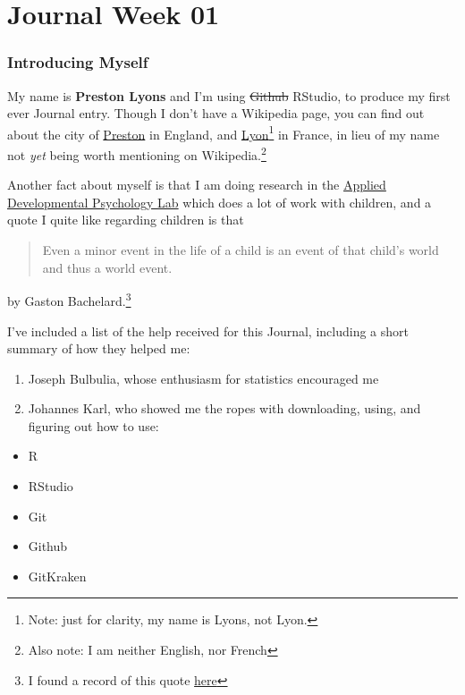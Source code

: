 \documentclass[
]{article}
\author{}
\date{\vspace{-2.5em}}
\providecommand{\tightlist}{%
  \setlength{\itemsep}{0pt}\setlength{\parskip}{0pt}}
\begin{document}
\hypertarget{journal-week-01}{%
\section{Journal Week 01}\label{journal-week-01}}

\hypertarget{introducing-myself}{%
\subsubsection{Introducing Myself}\label{introducing-myself}}

My name is \textbf{Preston Lyons} and I'm using \sout{Github} RStudio,
to produce my first ever Journal entry. Though I don't have a Wikipedia
page, you can find out about the city of
\href{https://en.wikipedia.org/wiki/Preston,_Lancashire}{Preston} in
England, and \href{https://en.wikipedia.org/wiki/Lyon}{Lyon}\footnote{Note:
  just for clarity, my name is Lyons, not Lyon.} in France, in lieu of
my name not \emph{yet} being worth mentioning on Wikipedia.\footnote{Also
  note: I am neither English, nor French}

Another fact about myself is that I am doing research in the
\href{https://applieddevelopmentallab.com/}{Applied Developmental
Psychology Lab} which does a lot of work with children, and a quote I
quite like regarding children is that

\begin{quote}
Even a minor event in the life of a child is an event of that child's
world and thus a world event.
\end{quote}

by Gaston Bachelard.\footnote{I found a record of this quote
  \href{https://www.goodreads.com/quotes/471937-even-a-minor-event-in-the-life-of-a-child}{here}}

I've included a list of the help received for this Journal, including a
short summary of how they helped me:

\begin{enumerate}
\def\labelenumi{\arabic{enumi}.}
\tightlist
\item
  Joseph Bulbulia, whose enthusiasm for statistics encouraged me
\item
  Johannes Karl, who showed me the ropes with downloading, using, and
  figuring out how to use:
\end{enumerate}

\begin{itemize}
\tightlist
\item
  R
\item
  RStudio
\item
  Git
\item
  Github
\item
  GitKraken
\end{itemize}
\end{document}
